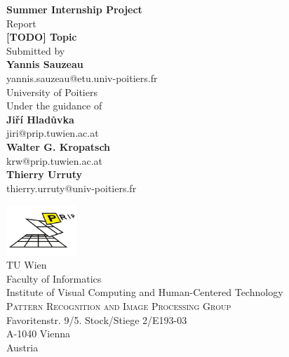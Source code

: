 \begin{titlepage}

\begin{center}

\textup{\small {\bf Summer Internship Project} \\ Report}\\[0.3in]

\Large \textbf {[TODO] Topic}\\[0.7in]

\normalsize Submitted by \\[0.2in]
\textbf{Yannis Sauzeau}\\
yannis.sauzeau@etu.univ-poitiers.fr\\
University of Poitiers\\

\vspace{.2in}
Under the guidance of\\[0.2in]
\textbf{Jiří Hladůvka}\\
jiri@prip.tuwien.ac.at\\
\vspace{0.1cm}
\textbf{Walter G. Kropatsch}\\
krw@prip.tuwien.ac.at\\
\vspace{0.1cm}
\textbf{Thierry Urruty}\\
thierry.urruty@univ-poitiers.fr



\vspace{.3in}

\includegraphics[width=0.2\textwidth]{figures/prip.png}\\[0.1in]
\Large{
TU Wien\\
\vspace{0.1cm}
Faculty of Informatics\\
\vspace{0.1cm}
Institute of Visual Computing and Human-Centered Technology}\\
\normalsize
\vspace{0.25cm}
\textsc{Pattern Recognition and Image Processing Group}\\
\vspace{0.15cm}
Favoritenstr. 9/5. Stock/Stiege 2/E193-03\\
A-1040 Vienna\\
Austria \\

\end{center}

\end{titlepage}
